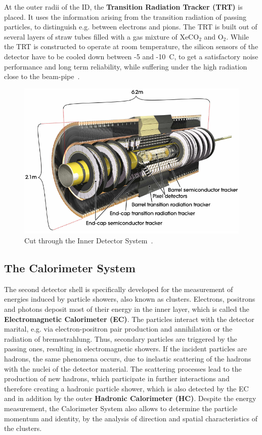 \noindent At the outer radii of the ID, the \textbf{Transition Radiation Tracker (TRT)} is placed.
It uses the information arising from the transition radiation of passing particles, to distinguish e.g. between electrons and pions. The TRT is built out of several layers of straw tubes filled with a gas mixture of XeCO$_2$ and O$_2$. While the TRT is constructed to operate at room temperature, the silicon sensors of the detector have to be cooled down between -5 and -10~\textdegree C, to get a satisfactory noise performance and long term reliability, while suffering under the high radiation close to the beam-pipe~\cite{Aad:2008zzm}.     
\begin{figure}[t]
	\centering
	\includegraphics[width=0.7\linewidth]{Pics/cp3/34}
	\caption{Cut through the Inner Detector System~\cite{Aad:2008zzm}.} 
	\label{fig:34}
\end{figure}

\subsection{The Calorimeter System}\label{CD}




The second detector shell is specifically developed for the measurement of energies induced by particle showers, also known as clusters. 
Electrons, positrons and photons deposit most of their energy in the inner layer, which is called the \textbf{Electromagnetic Calorimeter (EC)}.  The particles interact with the  detector marital, e.g. via electron-positron pair production and annihilation or the radiation of bremsstrahlung. Thus, secondary particles are triggered by the passing ones, resulting in electromagnetic showers. If the incident particles are hadrons, the same phenomena occurs, due to inelastic scattering  of the hadrons with the nuclei of the detector material. The scattering processes lead to the production of new hadrons, which participate in further interactions and therefore creating a hadronic particle shower, which is also detected by the EC and in addition by the outer \textbf{Hadronic Calorimeter (HC)}. Despite the energy measurement, the Calorimeter System also allows to determine the  particle momentum and identity, by the analysis of direction and spatial characteristics of the clusters.\\

